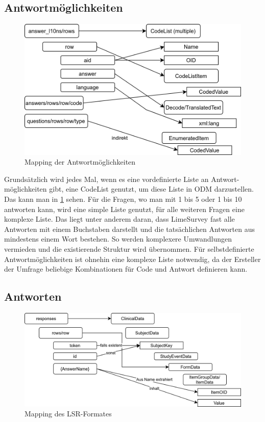 \subsection{Antwortmöglichkeiten}

\begin{figure}[h]
	\centering
	\includegraphics[width=.9\textwidth]{./img/m_answers.png}
	\caption{Mapping der Antwortmöglichkeiten}
	\label{fig:ans}
\end{figure}

Grundsätzlich wird jedes Mal, wenn es eine vordefinierte Liste an Antwort- möglichkeiten gibt, eine CodeList genutzt, um diese Liste in ODM darzustellen.
Das kann man in \cref{fig:ans} sehen.
Für die Fragen, wo man mit 1 bis 5 oder 1 bis 10 antworten kann, wird eine simple Liste genutzt, für alle weiteren Fragen eine komplexe Liste.
Das liegt unter anderem daran, dass LimeSurvey fast alle Antworten mit einem Buchstaben darstellt und die tatsächlichen Antworten aus mindestens einem Wort bestehen.
So werden komplexere Umwandlungen vermieden und die existierende Struktur wird übernommen.
Für selbstdefinierte Antwortmöglichkeiten ist ohnehin eine komplexe Liste notwendig, da der Ersteller der Umfrage beliebige Kombinationen für Code und Antwort definieren kann.

\subsection{Antworten}

\begin{figure}[h]
	\centering
	\includegraphics[width=1\textwidth]{./img/m_lsr.png}
	\caption{Mapping des LSR-Formates}
	\label{fig:m:lsr}
\end{figure}

